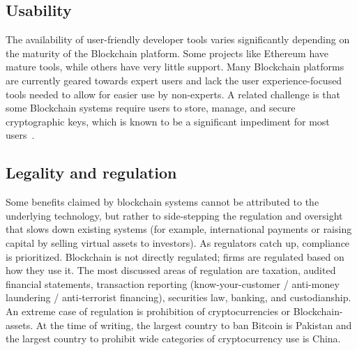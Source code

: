 \subsection{Usability} %
The availability of user-friendly developer tools varies significantly 
depending on the maturity of the Blockchain platform. Some projects like 
Ethereum have mature tools, while others have very little support. Many 
Blockchain platforms are currently geared towards expert users and lack the 
user experience-focused tools needed to allow for easier use by non-experts.
A related challenge is that some Blockchain systems require users to store, 
manage, and secure cryptographic keys, which is known to be a significant 
impediment for most users~\cite{ruoti2019usability}.


\subsection{Legality and regulation}

Some benefits claimed by blockchain systems cannot be attributed to the underlying technology, but rather to side-stepping the regulation and oversight that slows down existing systems (for example, international payments or raising capital by selling virtual assets to investors). As regulators catch up, compliance is prioritized. Blockchain is not directly regulated; firms are regulated based on how they use it. The most discussed areas of regulation are taxation, audited financial statements, transaction reporting (know-your-customer / anti-money laundering / anti-terrorist financing), securities law, banking, and custodianship. An extreme case of regulation is prohibition of cryptocurrencies or Blockchain-assets. At the time of writing, the largest country to ban Bitcoin is Pakistan and the largest country to prohibit wide categories of cryptocurrency use is China.


